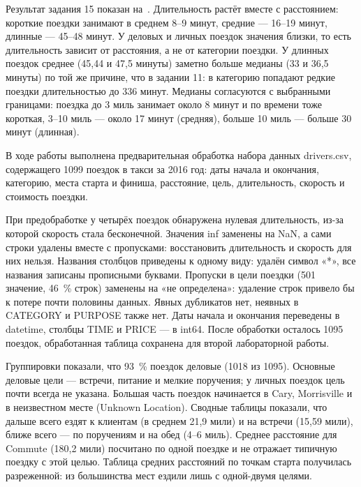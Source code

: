 \documentclass[a4paper,14pt]{extarticle}
\begin{document}

Результат задания 15 показан на~. Длительность растёт вместе с расстоянием: короткие поездки занимают в среднем 8–9 минут, средние — 16–19 минут, длинные — 45–48 минут. У деловых и личных поездок значения близки, то есть длительность зависит от расстояния, а не от категории поездки. У длинных поездок среднее (45,44 и 47,5 минуты) заметно больше медианы (33 и 36,5 минуты) по той же причине, что в задании 11: в категорию попадают редкие поездки длительностью до 336 минут. Медианы согласуются с выбранными границами: поездка до 3 миль занимает около 8 минут и по времени тоже короткая, 3–10 миль — около 17 минут (средняя), больше 10 миль — больше 30 минут (длинная).


\suaiconclusion

В ходе работы выполнена предварительная обработка набора данных drivers.csv, содержащего 1099 поездок в такси за 2016 год: даты начала и окончания, категорию, места старта и финиша, расстояние, цель, длительность, скорость и стоимость поездки.

При предобработке у четырёх поездок обнаружена нулевая длительность, из-за которой скорость стала бесконечной. Значения inf заменены на NaN, а сами строки удалены вместе с пропусками: восстановить длительность и скорость для них нельзя. Названия столбцов приведены к одному виду: удалён символ «*», все названия записаны прописными буквами. Пропуски в цели поездки (501 значение, 46~\% строк) заменены на «не определена»: удаление строк привело бы к потере почти половины данных. Явных дубликатов нет, неявных в CATEGORY и PURPOSE также нет. Даты начала и окончания переведены в datetime, столбцы TIME и PRICE — в int64. После обработки осталось 1095 поездок, обработанная таблица сохранена для второй лабораторной работы.

Группировки показали, что 93~\% поездок деловые (1018 из 1095). Основные деловые цели — встречи, питание и мелкие поручения; у личных поездок цель почти всегда не указана. Большая часть поездок начинается в Cary, Morrisville и в неизвестном месте (Unknown Location). Сводные таблицы показали, что дальше всего ездят к клиентам (в среднем 21,9 мили) и на встречи (15,59 мили), ближе всего — по поручениям и на обед (4–6 миль). Среднее расстояние для Commute (180,2 мили) посчитано по одной поездке и не отражает типичную поездку с этой целью. Таблица средних расстояний по точкам старта получилась разреженной: из большинства мест ездили лишь с одной-двумя целями.
\end{document}
